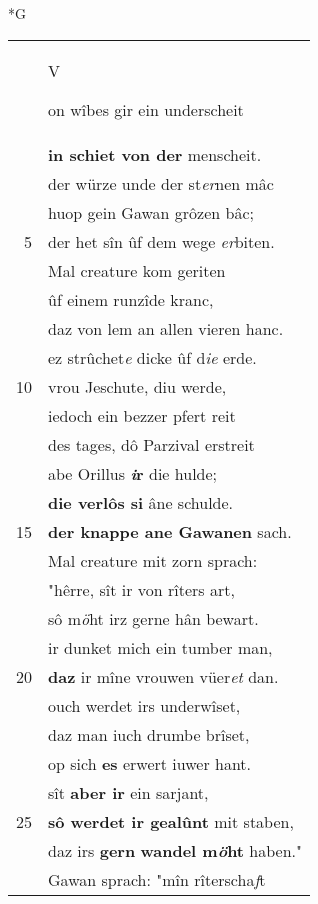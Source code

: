 \documentclass[8pt,a4paper,notitlepage]{article}
\begin{document}
\begin{table}[ht]
\begin{minipage}[t]{0.5\linewidth}
\small
\begin{center}*G
\end{center}
\begin{tabular}{rl}
 & \begin{large}V\end{large}on wîbes gir ein underscheit\\ 
 & \textbf{in schiet von der} menscheit.\\ 
 & der würze unde der st\textit{er}nen mâc\\ 
 & huop gein Gawan grôzen bâc;\\ 
5 & der het sîn ûf dem wege \textit{er}biten.\\ 
 & Mal creature kom geriten\\ 
 & ûf einem runzîde kranc,\\ 
 & daz von lem an allen vieren hanc.\\ 
 & ez strûchet\textit{e} dicke ûf d\textit{ie} erde.\\ 
10 & vrou Jeschute, diu werde,\\ 
 & iedoch ein bezzer pfert reit\\ 
 & des tages, dô Parzival erstreit\\ 
 & abe Orillus \textbf{\textit{i}r} die hulde;\\ 
 & \textbf{die verlôs si} âne schulde.\\ 
15 & \textbf{der knappe ane Gawanen} sach.\\ 
 & Mal creature mit zorn sprach:\\ 
 & "hêrre, sît ir von rîters art,\\ 
 & sô m\textit{ö}ht irz gerne hân bewart.\\ 
 & ir dunket mich ein tumber man,\\ 
20 & \textbf{daz} ir mîne vrouwen vüer\textit{et} dan.\\ 
 & ouch werdet irs underwîset,\\ 
 & daz man iuch drumbe brîset,\\ 
 & op sich \textbf{es} erwert iuwer hant.\\ 
 & sît \textbf{aber ir} ein sarjant,\\ 
25 & \textbf{sô werdet ir gealûnt} mit staben,\\ 
 & daz irs \textbf{gern} \textbf{wandel m\textit{ö}ht} haben."\\ 
 & Gawan sprach: "mîn rîterscha\textit{f}t\\ 

\end{tabular}
\end{minipage}
\end{table}
\end{document}
